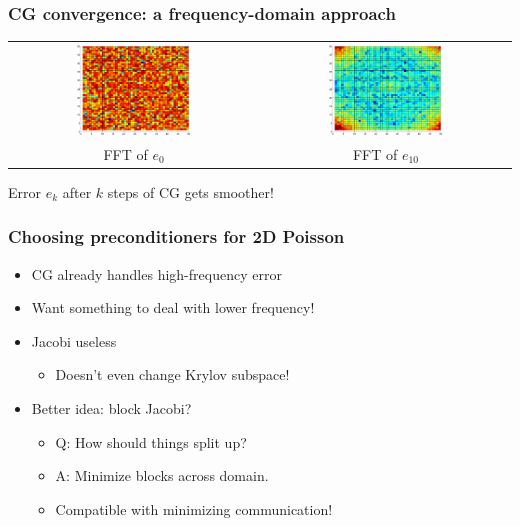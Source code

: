\documentclass{beamer}
\begin{document}
\begin{frame}
  \frametitle{CG convergence: a frequency-domain approach}

  \begin{tabular}{cc}
    \includegraphics[width=0.48\textwidth]{figs/cg1init.pdf} &
    \includegraphics[width=0.48\textwidth]{figs/cg1swept.pdf} \\
    FFT of $e_0$ & FFT of $e_{10}$
  \end{tabular}

  \begin{center}
  Error $e_k$ after $k$ steps of CG gets smoother!
  \end{center}
\end{frame}


\begin{frame}
  \frametitle{Choosing preconditioners for 2D Poisson}

  \begin{itemize}
  \item CG already handles high-frequency error
  \item Want something to deal with lower frequency!
  \item Jacobi useless
    \begin{itemize}
    \item Doesn't even change Krylov subspace!
    \end{itemize}
  \item Better idea: block Jacobi?
    \begin{itemize}
    \item Q: How should things split up?
    \item A: Minimize blocks across domain.
    \item Compatible with minimizing communication!
    \end{itemize}
  \end{itemize}
\end{frame}
\end{document}

